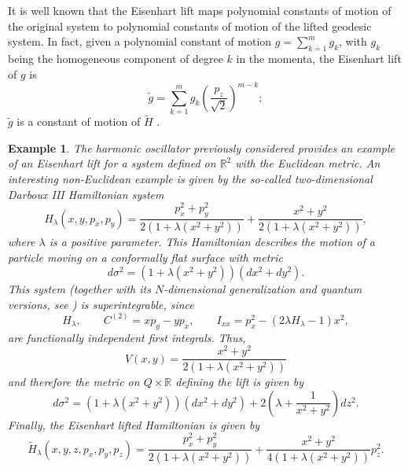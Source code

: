 \documentclass[10pt,a4paper]{article}
\newtheorem{example}{Example}
\begin{document}
It is well known that the Eisenhart lift maps polynomial constants of motion of the original system to polynomial constants of motion of the lifted geodesic system. In fact, given a polynomial constant of motion $g=\displaystyle{\sum_{k=1}^{m}}g_{k}$, with $g_{k}$ being the homogeneous component of degree $k$ in the momenta, the Eisenhart lift of $g$ is
\begin{equation*}
\tilde{g}=\displaystyle{\sum_{k=1}^{m}}g_{k}\left(\frac{p_z}{\sqrt{2}}\right)^{m-k};
\end{equation*}
$\tilde{g}$ is a constant of motion of $\tilde{H}$ \cite{cariglia2014hidden}.

\begin{example}
The harmonic oscillator previously considered provides an example of an Eisenhart lift for a system defined on $\mathbb R^2$ with the Euclidean metric. An interesting non-Euclidean example is given by the so-called two-dimensional Darboux III Hamiltonian system 
    \begin{equation*}
H_\lambda(x,y,p_x,p_y) = \frac{p_x^2+p_y^2}{2 (1+ \lambda (x^2 + y^2))} + \frac{x^2+y^2}{2 (1+ \lambda (x^2 + y^2))} ,
    \end{equation*}
where $\lambda$ is a positive parameter. This Hamiltonian describes the motion of a particle moving on a conformally flat surface with metric 
\begin{equation*}
    d\sigma^2 = (1+ \lambda (x^2 + y^2)) (dx^2 + dy^2) .
\end{equation*}
This system (together with its $N$-dimensional generalization and quantum versions, see \cite{BALLESTEROS2008505,BALLESTEROS20111431,BALLESTEROS2023133618,baena2026fock}) is superintegrable, since 
\begin{equation*}
    H_\lambda, \qquad
C^{(2)}=xp_y-yp_x,\qquad
I_{xx}=p_x^2-(2 \lambda H_\lambda- 1) x^2 ,
\end{equation*}
are functionally independent first integrals. Thus,
\begin{equation*}
    V(x,y) = \frac{x^2+y^2}{2 (1+ \lambda (x^2 + y^2))}
\end{equation*}
and therefore the metric on $Q \times \mathbb R$ defining the lift is given by
\begin{equation*}
    d\sigma^2 = (1+ \lambda (x^2 + y^2)) (dx^2 + dy^2) + 2 \left(\lambda + \frac{1}{x^2+y^2} \right) dz^2.
\end{equation*}
Finally, the Eisenhart lifted Hamiltonian is given by
\begin{equation*}
    \widetilde H_\lambda(x,y,z,p_x,p_y,p_z) = \frac{p_x^2+p_y^2}{2 (1+ \lambda (x^2 + y^2))} + \frac{x^2+y^2}{4 (1+ \lambda (x^2 + y^2))} p_z^2 .

\end{equation*}
\end{example}
\end{document}
